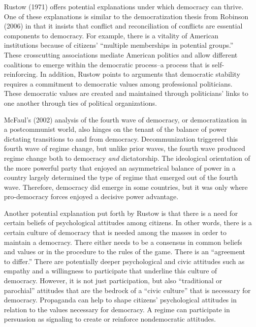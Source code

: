\documentclass[12pt,]{article}
\begin{document}
Rustow (1971) offers potential explanations under which democracy can
thrive. One of these explanations is similar to the democratization
thesis from Robinson (2006) in that it insists that conflict and
reconciliation of conflicts are essential components to democracy. For
example, there is a vitality of American institutions because of
citizens' ``multiple memberships in potential groups.'' These
crosscutting associations mediate American politics and allow different
coalitions to emerge within the democratic process--a process that is
self-reinforcing. In addition, Rustow points to arguments that
democratic stability requires a commitment to democratic values among
professional politicians. These democratic values are created and
maintained through politicians' links to one another through ties of
political organizations.

McFaul's (2002) analysis of the fourth wave of democracy, or
democratization in a postcommunist world, also hinges on the tenant of
the balance of power dictating transitions to and from democracy.
Decommunization triggered this fourth wave of regime change, but unlike
prior waves, the fourth wave produced regime change both to democracy
\emph{and} dictatorship. The ideological orientation of the more
powerful party that enjoyed an asymmetrical balance of power in a
country largely determined the type of regime that emerged out of the
fourth wave. Therefore, democracy did emerge in some countries, but it
was only where pro-democracy forces enjoyed a decisive power advantage.

Another potential explanation put forth by Rustow is that there is a
need for certain beliefs of psychological attitudes among citizens. In
other words, there is a certain culture of democracy that is needed
among the masses in order to maintain a democracy. There either needs to
be a consensus in common beliefs and values or in the procedure to the
rules of the game. There is an ``agreement to differ.'' There are
potentially deeper psychological and civic attitudes such as empathy and
a willingness to participate that underline this culture of democracy.
However, it is not just participation, but also ``traditional or
parochial'' attitudes that are the bedrock of a ``civic culture'' that
is necessary for democracy. Propaganda can help to shape citizens'
psychological attitudes in relation to the values necessary for
democracy. A regime can participate in persuasion as signaling to create
or reinforce nondemocratic attitudes.
\end{document}
